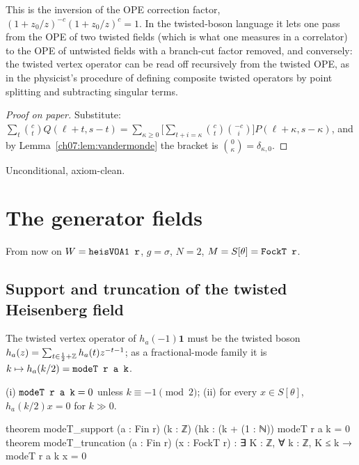 \begin{physics}
This is the inversion of the OPE correction factor, $(1+z_0/z)^{-c}(1+z_0/z)^{c}=1$. In the twisted-boson language it lets one pass from the OPE of two twisted fields (which is what one measures in a correlator) to the OPE of untwisted fields with a branch-cut factor removed, and conversely: the twisted vertex operator can be read off recursively from the twisted OPE, as in the physicist's procedure of defining composite twisted operators by point splitting and subtracting singular terms.
\end{physics}

\begin{proof}[Proof on paper]
Substitute: $\sum_t\binom ct Q(\ell+t,s-t) = \sum_{\kappa\ge0}\bigl[\sum_{t+i=\kappa}\binom ct
\binom{-c}{i}\bigr]P(\ell+\kappa,s-\kappa)$, and by Lemma~\ref{ch07:lem:vandermonde} the bracket
is $\binom{0}{\kappa} = \delta_{\kappa,0}$.
\end{proof}

\begin{status}
Unconditional, axiom-clean.
\end{status}

\section{The generator fields}\label{ch07:sec:generators}

From now on $W = \lean{heisVOA1 r}$, $g = \sigma$, $N=2$, $M = S[\theta] = \lean{FockT r}$.

\subsection{Support and truncation of the twisted Heisenberg field}

The twisted vertex operator of $h_a(-1)\mathbf 1$ must be the twisted boson $h_a(z) =
\sum_{t\in\frac12+{\mathbb{Z}}}h_a(t)z^{-t-1}$; as a fractional-mode family it is $k\mapsto h_a(k/2) =
\lean{modeT r a k}$.

\begin{proposition}\label{ch07:prop:gensupport}
(i) $\lean{modeT r a k} = 0$ unless $k\equiv -1\pmod 2$; (ii) for every $x\in S[\theta]$,
$h_a(k/2)x = 0$ for $k\gg0$.
\end{proposition}

\begin{leancode}
theorem modeT_support (a : Fin r) (k : ℤ) (hk : (k + (1 : ℕ)) %
    modeT r a k = 0
theorem modeT_truncation (a : Fin r) (x : FockT r) :
    ∃ K : ℤ, ∀ k : ℤ, K ≤ k → modeT r a k x = 0
\end{leancode}

